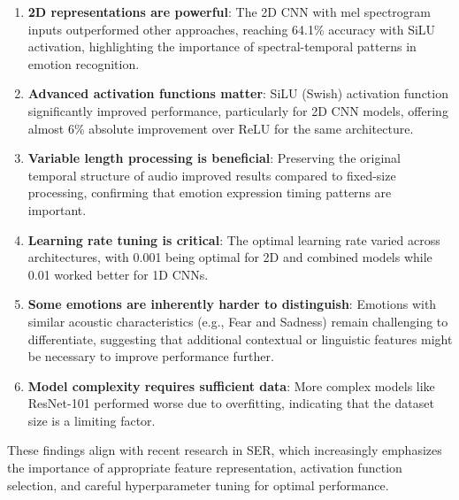 \begin{enumerate}
    \item \textbf{2D representations are powerful}: The 2D CNN with mel spectrogram inputs outperformed other approaches, reaching 64.1\% accuracy with SiLU activation, highlighting the importance of spectral-temporal patterns in emotion recognition.
    
    \item \textbf{Advanced activation functions matter}: SiLU (Swish) activation function significantly improved performance, particularly for 2D CNN models, offering almost 6\% absolute improvement over ReLU for the same architecture.
    
    \item \textbf{Variable length processing is beneficial}: Preserving the original temporal structure of audio improved results compared to fixed-size processing, confirming that emotion expression timing patterns are important.
    
    \item \textbf{Learning rate tuning is critical}: The optimal learning rate varied across architectures, with 0.001 being optimal for 2D and combined models while 0.01 worked better for 1D CNNs.
    
    \item \textbf{Some emotions are inherently harder to distinguish}: Emotions with similar acoustic characteristics (e.g., Fear and Sadness) remain challenging to differentiate, suggesting that additional contextual or linguistic features might be necessary to improve performance further.

    \item \textbf{Model complexity requires sufficient data}: More complex models like ResNet-101 performed worse due to overfitting, indicating that the dataset size is a limiting factor.
\end{enumerate}

These findings align with recent research in SER, which increasingly emphasizes the importance of appropriate feature representation, activation function selection, and careful hyperparameter tuning for optimal performance. 